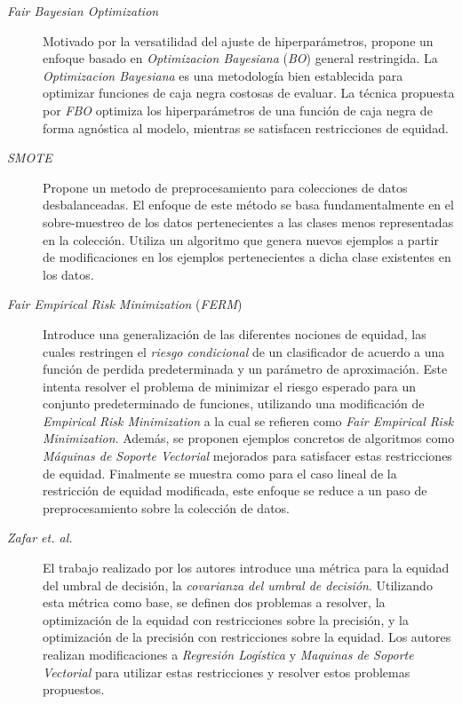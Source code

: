 \begin{description}

\item[\emph{Fair Bayesian Optimization}~\parencite{perrone2021fbo}]
Motivado por la versatilidad del ajuste de hiperparámetros, propone un enfoque basado en \emph{Optimizacion Bayesiana} (\emph{BO}) general restringida.
La \emph{Optimizacion Bayesiana} es una metodología bien establecida para optimizar funciones de caja negra costosas de evaluar.
La técnica propuesta por \emph{FBO} optimiza los hiperparámetros de una función de caja negra de forma agnóstica al modelo, mientras se satisfacen restricciones de equidad.

\item[\emph{SMOTE} \parencite{chawla2002smote}]
Propone un metodo de preprocesamiento para colecciones de datos desbalanceadas.
El enfoque de este método se basa fundamentalmente en el sobre-muestreo de los datos pertenecientes a las clases menos representadas en la colección.
Utiliza un algoritmo que genera nuevos ejemplos a partir de modificaciones en los ejemplos pertenecientes a dicha clase existentes en los datos.

\item[\emph{Fair Empirical Risk Minimization} (\emph{FERM}) \parencite{FERM}]
Introduce una generalización de las diferentes nociones de equidad, las cuales restringen el \emph{riesgo condicional} de un clasificador de acuerdo a una función de perdida predeterminada y un parámetro de aproximación.
Este intenta resolver el problema de minimizar el riesgo esperado para un conjunto predeterminado de funciones, utilizando una modificación de \emph{Empirical Risk Minimization} a la cual se refieren como \emph{Fair Empirical Risk Minimization}.
Además, se proponen ejemplos concretos de algoritmos como \emph{Máquinas de Soporte Vectorial} mejorados para satisfacer estas restricciones de equidad.
Finalmente se muestra como para el caso lineal de la restricción de equidad modificada, este enfoque se reduce a un paso de preprocesamiento sobre la colección de datos. %

\item[\emph{Zafar et. al.} \parencite{zafar2017fairness}] El trabajo realizado por  los autores introduce una métrica para la equidad del umbral de decisión, la \emph{covarianza del umbral de decisión}.
Utilizando esta métrica como base, se definen dos problemas a resolver, la optimización de la equidad con restricciones sobre la precisión, y la optimización de la precisión con restricciones sobre la equidad.
Los autores realizan modificaciones a \emph{Regresión Logística} y \emph{Maquinas de Soporte Vectorial} para utilizar estas restricciones y resolver estos problemas propuestos.


\end{description}
